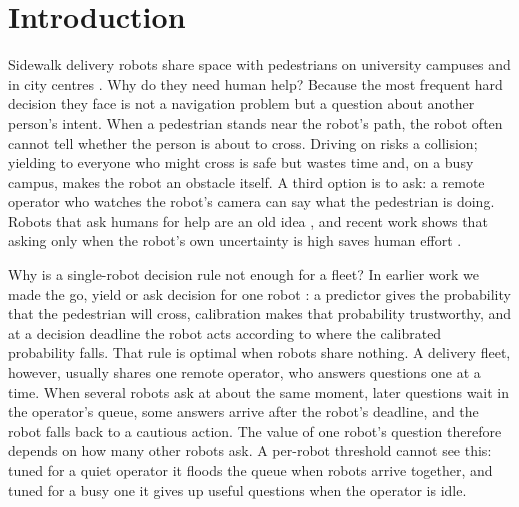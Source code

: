\documentclass[a4paper,fleqn]{cas-dc}
\begin{document}
\maketitle


\section{Introduction}
\label{sec:intro}

Sidewalk delivery robots share space with pedestrians on university campuses and in city centres \citep{jennings2019sidewalk}. Why do they need human help? Because the most frequent hard decision they face is not a navigation problem but a question about another person's intent. When a pedestrian stands near the robot's path, the robot often cannot tell whether the person is about to cross. Driving on risks a collision; yielding to everyone who might cross is safe but wastes time and, on a busy campus, makes the robot an obstacle itself. A third option is to ask: a remote operator who watches the robot's camera can say what the pedestrian is doing. Robots that ask humans for help are an old idea \citep{fong2003asker}, and recent work shows that asking only when the robot's own uncertainty is high saves human effort \citep{ren2023knowno}.

Why is a single-robot decision rule not enough for a fleet? In earlier work we made the go, yield or ask decision for one robot \citep{udekwe2026askoract}: a predictor gives the probability that the pedestrian will cross, calibration makes that probability trustworthy, and at a decision deadline the robot acts according to where the calibrated probability falls. That rule is optimal when robots share nothing. A delivery fleet, however, usually shares one remote operator, who answers questions one at a time. When several robots ask at about the same moment, later questions wait in the operator's queue, some answers arrive after the robot's deadline, and the robot falls back to a cautious action. The value of one robot's question therefore depends on how many other robots ask. A per-robot threshold cannot see this: tuned for a quiet operator it floods the queue when robots arrive together, and tuned for a busy one it gives up useful questions when the operator is idle.
\end{document}
